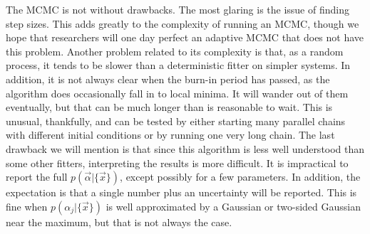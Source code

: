 The MCMC is not without drawbacks.  The most glaring is the issue of
finding step sizes.  This adds greatly to the complexity of running an
MCMC, though we hope that researchers will one day perfect an adaptive
MCMC that does not have this problem.  Another problem related to its
complexity is that, as a random process, it tends to be slower than a
deterministic fitter on simpler systems.  In addition, it is not
always clear when the burn-in period has passed, as the algorithm does
occasionally fall in to local minima.  It will wander out of them
eventually, but that can be much longer than is reasonable to wait.
This is unusual, thankfully, and can be tested by either starting many
parallel chains with different initial conditions or by running one
very long chain.  The last drawback we will mention is that since this
algorithm is less well understood than some other fitters,
interpreting the results is more difficult.  It is impractical to
report the full $p(\vec{\alpha}|\{\vec{x}\})$, except possibly for a
few parameters.  In addition, the expectation is that a single number
plus an uncertainty will be reported.  This is fine when
$p(\alpha_j|\{\vec{x}\})$ is well approximated by a Gaussian or
two-sided Gaussian near the maximum, but that is not always the case.

